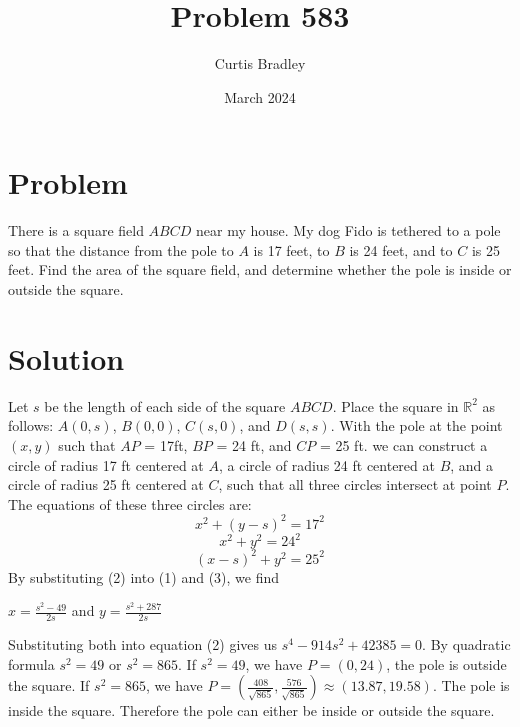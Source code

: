 \documentclass{article}
\title{Problem 583}
\author{Curtis Bradley}
\date{March 2024}
\begin{document}
\maketitle
\section{Problem}
There is a square field $ABCD$ near my house. My dog Fido is tethered to a pole so that the distance from the pole to $A$ is 17 feet, to $B$ is 24 feet, and to $C$ is 25 feet. Find the area of the square field, and determine whether the pole is inside or outside the square.

\section{Solution}
Let $s$ be the length of each side of the square $ABCD$. Place the square in $\mathbb{R}^2$ as follows: $A(0,s)$, $B(0,0)$, $C(s,0)$, and $D(s,s)$. With the pole at the point $(x,y)$ such that $AP$ = 17ft, $BP$ = 24 ft, and $CP$ = 25 ft. we can construct a circle of radius 17 ft centered at $A$, a circle of radius 24 ft centered at $B$, and a circle of radius 25 ft centered at $C$, such that all three circles intersect at point $P$. The equations of these three circles are:
\begin{equation}
    x^2 + (y-s)^2 = 17^2
\end{equation}
\begin{equation}
    x^2+y^2=24^2
\end{equation}
\begin{equation}
    (x-s)^2 + y^2 = 25^2
\end{equation}
By substituting (2) into (1) and (3), we find 

\begin{center}
    $x = \frac{s^2-49}{2s}$ and $y=\frac{s^2 + 287}{2s}$
\end{center}
Substituting both into equation (2) gives us
$s^4 - 914s^2+ 42385 = 0$. By quadratic formula $s^2 = 49$ or $s^2 = 865$. If $s^2 = 49$, we have $P = (0,24)$, the pole is outside the square. If $s^2 = 865$, we have $P = (\frac{408}{\sqrt{865}},\frac{576}{\sqrt{865}})\approx (13.87,19.58)$. The pole is inside the square. Therefore the pole can either be inside or outside the square.
\end{document}

